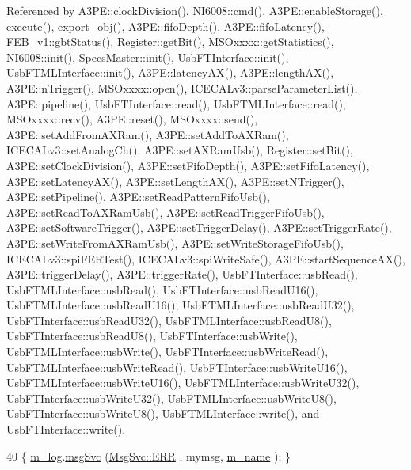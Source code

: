Referenced by A3\+P\+E\+::clock\+Division(), N\+I6008\+::cmd(), A3\+P\+E\+::enable\+Storage(), execute(), export\+\_\+obj(), A3\+P\+E\+::fifo\+Depth(), A3\+P\+E\+::fifo\+Latency(), F\+E\+B\+\_\+v1\+::gbt\+Status(), Register\+::get\+Bit(), M\+S\+Oxxxx\+::get\+Statistics(), N\+I6008\+::init(), Specs\+Master\+::init(), Usb\+F\+T\+Interface\+::init(), Usb\+F\+T\+M\+L\+Interface\+::init(), A3\+P\+E\+::latency\+A\+X(), A3\+P\+E\+::length\+A\+X(), A3\+P\+E\+::n\+Trigger(), M\+S\+Oxxxx\+::open(), I\+C\+E\+C\+A\+Lv3\+::parse\+Parameter\+List(), A3\+P\+E\+::pipeline(), Usb\+F\+T\+Interface\+::read(), Usb\+F\+T\+M\+L\+Interface\+::read(), M\+S\+Oxxxx\+::recv(), A3\+P\+E\+::reset(), M\+S\+Oxxxx\+::send(), A3\+P\+E\+::set\+Add\+From\+A\+X\+Ram(), A3\+P\+E\+::set\+Add\+To\+A\+X\+Ram(), I\+C\+E\+C\+A\+Lv3\+::set\+Analog\+Ch(), A3\+P\+E\+::set\+A\+X\+Ram\+Usb(), Register\+::set\+Bit(), A3\+P\+E\+::set\+Clock\+Division(), A3\+P\+E\+::set\+Fifo\+Depth(), A3\+P\+E\+::set\+Fifo\+Latency(), A3\+P\+E\+::set\+Latency\+A\+X(), A3\+P\+E\+::set\+Length\+A\+X(), A3\+P\+E\+::set\+N\+Trigger(), A3\+P\+E\+::set\+Pipeline(), A3\+P\+E\+::set\+Read\+Pattern\+Fifo\+Usb(), A3\+P\+E\+::set\+Read\+To\+A\+X\+Ram\+Usb(), A3\+P\+E\+::set\+Read\+Trigger\+Fifo\+Usb(), A3\+P\+E\+::set\+Software\+Trigger(), A3\+P\+E\+::set\+Trigger\+Delay(), A3\+P\+E\+::set\+Trigger\+Rate(), A3\+P\+E\+::set\+Write\+From\+A\+X\+Ram\+Usb(), A3\+P\+E\+::set\+Write\+Storage\+Fifo\+Usb(), I\+C\+E\+C\+A\+Lv3\+::spi\+F\+E\+R\+Test(), I\+C\+E\+C\+A\+Lv3\+::spi\+Write\+Safe(), A3\+P\+E\+::start\+Sequence\+A\+X(), A3\+P\+E\+::trigger\+Delay(), A3\+P\+E\+::trigger\+Rate(), Usb\+F\+T\+Interface\+::usb\+Read(), Usb\+F\+T\+M\+L\+Interface\+::usb\+Read(), Usb\+F\+T\+Interface\+::usb\+Read\+U16(), Usb\+F\+T\+M\+L\+Interface\+::usb\+Read\+U16(), Usb\+F\+T\+M\+L\+Interface\+::usb\+Read\+U32(), Usb\+F\+T\+Interface\+::usb\+Read\+U32(), Usb\+F\+T\+M\+L\+Interface\+::usb\+Read\+U8(), Usb\+F\+T\+Interface\+::usb\+Read\+U8(), Usb\+F\+T\+Interface\+::usb\+Write(), Usb\+F\+T\+M\+L\+Interface\+::usb\+Write(), Usb\+F\+T\+Interface\+::usb\+Write\+Read(), Usb\+F\+T\+M\+L\+Interface\+::usb\+Write\+Read(), Usb\+F\+T\+Interface\+::usb\+Write\+U16(), Usb\+F\+T\+M\+L\+Interface\+::usb\+Write\+U16(), Usb\+F\+T\+M\+L\+Interface\+::usb\+Write\+U32(), Usb\+F\+T\+Interface\+::usb\+Write\+U32(), Usb\+F\+T\+M\+L\+Interface\+::usb\+Write\+U8(), Usb\+F\+T\+Interface\+::usb\+Write\+U8(), Usb\+F\+T\+M\+L\+Interface\+::write(), and Usb\+F\+T\+Interface\+::write().


\begin{DoxyCode}
40 \{ \hyperlink{classObject_a0d269813dd7ac1f24bc143031e2963f2}{m\_log}.\hyperlink{classMsgSvc_ad25f18047920cc59a314e5098259711c}{msgSvc} (\hyperlink{classMsgSvc_ae671eb7301996cd049d2da8a65925926a35a9d7166e9896af4ec8fb33bf5f1772}{MsgSvc::ERR}     , mymsg, \hyperlink{classObject_a8b83c95c705d2c3ba0d081fe1710f48d}{m\_name} ); \}
\end{DoxyCode}
\mbox{\label{classObject_ad7f6c457733082efa2f9ff5f5c8e119a}} 
